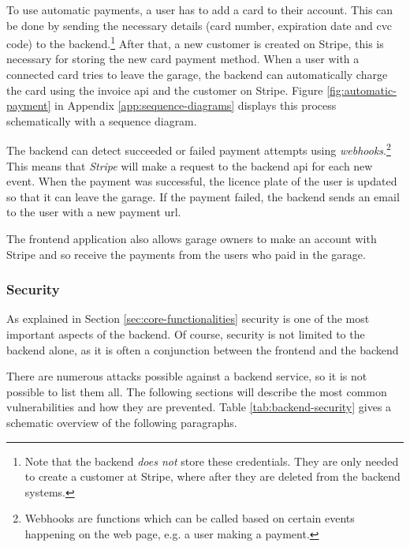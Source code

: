 \ind To use automatic payments, a user has to add a card to their account. This can be done by sending the necessary details (card number, expiration date and \ac{cvc} code) to the backend.\footnote{Note that the backend \textit{does not} store these credentials. They are only needed to create a customer at Stripe, where after they are deleted from the backend systems.} After that, a new customer is created on Stripe, this is necessary for storing the new card payment method. When a user with a connected card tries to leave the garage, the backend can automatically charge the card using the invoice \ac{api} and the customer on Stripe. Figure \ref{fig:automatic-payment} in Appendix \ref{app:sequence-diagrams} displays this process schematically with a sequence diagram.

\ind The backend can detect succeeded or failed payment attempts using \textit{webhooks}.\footnote{Webhooks are functions which can be called based on certain events happening on the web page, e.g. a user making a payment.} This means that \textit{Stripe} will make a request to the backend \ac{api} for each new event. When the payment was successful, the licence plate of the user is updated so that it can leave the garage. If the payment failed, the backend sends an email to the user with a new payment \ac{url}.

\ind The frontend application also allows garage owners to make an account with Stripe and so receive the payments from the users who paid in the garage. 


\subsubsection{Security}\label{subsec:sucurity}
As explained in Section \ref{sec:core-functionalities} security is one of the most important aspects of the backend. Of course, security is not limited to the backend alone, as it is often a conjunction between the frontend and the backend

There are numerous attacks possible against a backend service, so it is not possible to list them all. The following sections will describe the most common vulnerabilities and how they are prevented. Table \ref{tab:backend-security} gives a schematic overview of the following paragraphs.

